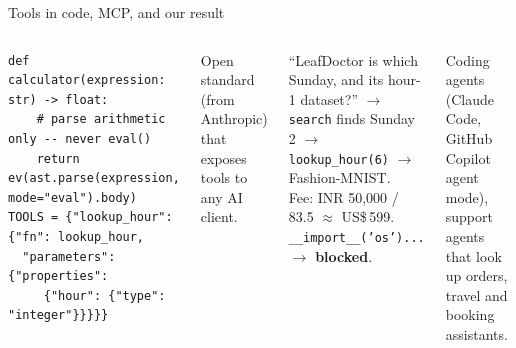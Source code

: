 \documentclass[aspectratio=169,11pt]{beamer}
\begin{document}
\begin{frame}[fragile]{Tools in code, MCP, and our result}
\begin{columns}[T]
\begin{bcode}
\begin{lstlisting}
def calculator(expression: str) -> float:
    # parse arithmetic only -- never eval()
    return ev(ast.parse(expression, mode="eval").body)
TOOLS = {"lookup_hour": {"fn": lookup_hour,
  "parameters": {"properties":
     {"hour": {"type": "integer"}}}}}
\end{lstlisting}
\end{bcode}
\begin{bdef}
Open standard (from Anthropic) that exposes tools to any AI client.
\end{bdef}
\begin{bres}
``LeafDoctor is which Sunday, and its hour-1 dataset?'' $\rightarrow$ \texttt{search} finds Sunday 2 $\rightarrow$ \texttt{lookup\_hour(6)} $\rightarrow$ Fashion-MNIST.\\
Fee: INR 50,000 / 83.5 $\approx$ US\$\,599.\\
\texttt{\_\_import\_\_('os')...} $\rightarrow$ \textbf{blocked}.
\end{bres}
\begin{bapp}
Coding agents (Claude Code, GitHub Copilot agent mode), support agents that look up orders, travel and booking assistants.
\end{bapp}
\end{columns}
\end{frame}

\end{document}

